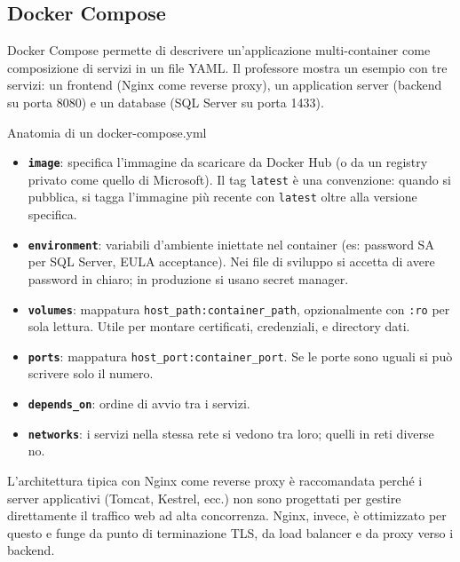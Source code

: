 \documentclass[
  italian,
  openany]{book}
\providecommand{\tightlist}{%
  \setlength{\itemsep}{0pt}\setlength{\parskip}{0pt}}
\begin{document}
\subsection{Docker Compose}\label{docker-compose}

Docker Compose permette di descrivere un'applicazione multi-container
come composizione di servizi in un file YAML. Il professore mostra un
esempio con tre servizi: un frontend (Nginx come reverse proxy), un
application server (backend su porta 8080) e un database (SQL Server su
porta 1433).

\begin{callouttip}{Anatomia di un docker-compose.yml}

\begin{itemize}
\tightlist
\item
  \textbf{\texttt{image}}: specifica l'immagine da scaricare da Docker
  Hub (o da un registry privato come quello di Microsoft). Il tag
  \texttt{latest} è una convenzione: quando si pubblica, si tagga
  l'immagine più recente con \texttt{latest} oltre alla versione
  specifica.
\item
  \textbf{\texttt{environment}}: variabili d'ambiente iniettate nel
  container (es: password SA per SQL Server, EULA acceptance). Nei file
  di sviluppo si accetta di avere password in chiaro; in produzione si
  usano secret manager.
\item
  \textbf{\texttt{volumes}}: mappatura
  \texttt{host\_path:container\_path}, opzionalmente con \texttt{:ro}
  per sola lettura. Utile per montare certificati, credenziali, e
  directory dati.
\item
  \textbf{\texttt{ports}}: mappatura
  \texttt{host\_port:container\_port}. Se le porte sono uguali si può
  scrivere solo il numero.
\item
  \textbf{\texttt{depends\_on}}: ordine di avvio tra i servizi.
\item
  \textbf{\texttt{networks}}: i servizi nella stessa rete si vedono tra
  loro; quelli in reti diverse no.
\end{itemize}

\end{callouttip}

L'architettura tipica con Nginx come reverse proxy è raccomandata perché
i server applicativi (Tomcat, Kestrel, ecc.) non sono progettati per
gestire direttamente il traffico web ad alta concorrenza. Nginx, invece,
è ottimizzato per questo e funge da punto di terminazione TLS, da load
balancer e da proxy verso i backend.
\end{document}
